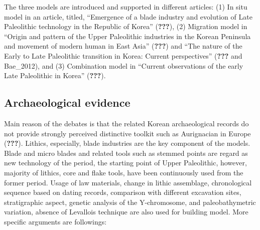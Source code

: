 \documentclass[american,man]{apa6}
\begin{document}
The three models are introduced and supported in different articles: (1)
In situ model in an article, titled, \enquote{Emergence of a blade
industry and evolution of Late Paleolithic technology in the Republic of
Korea} ({\textbf{???}}), (2) Migration model in \enquote{Origin and
pattern of the Upper Paleolithic industries in the Korean Peninsula and
movement of modern human in East Asia} ({\textbf{???}}) and \enquote{The
nature of the Early to Late Paleolithic transition in Korea: Current
perspectives} ({\textbf{???}} and Bae\_2012), and (3) Combination model
in \enquote{Current observations of the early Late Paleolithic in Korea}
({\textbf{???}}).

\subsection{Archaeological evidence}\label{archaeological-evidence}

Main reason of the debates is that the related Korean archaeological
records do not provide strongly perceived distinctive toolkit such as
Aurignacian in Europe ({\textbf{???}}). Lithics, especially, blade
industries are the key component of the models. Blade and micro blades
and related tools such as stemmed points are regard as new technology of
the period, the starting point of Upper Paleolithic, however, majority
of lithics, core and flake tools, have been continuously used from the
former period. Usage of law materials, change in lithic assemblage,
chronological sequence based on dating records, comparison with
different excavation sites, stratigraphic aspect, genetic analysis of
the Y-chromosome, and paleobathymetric variation, absence of Levallois
technique are also used for building model. More specific arguments are
followings:
\end{document}
